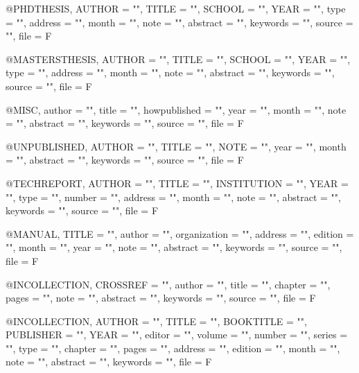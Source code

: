 @PHDTHESIS{,
  AUTHOR =       "",
  TITLE =        "",
  SCHOOL =       "",
  YEAR =         "",
  type =         "",
  address =      "",
  month =        "",
  note =         "",
  abstract =     "",
  keywords =     "",
  source =       "",
  file = F
}

@MASTERSTHESIS{,
  AUTHOR =       "",
  TITLE =        "",
  SCHOOL =       "",
  YEAR =         "",
  type =         "",
  address =      "",
  month =        "",
  note =         "",
  abstract =     "",
  keywords =     "",
  source =       "",
  file = F
}

@MISC{,
  author =       "",
  title =        "",
  howpublished = "",
  year =         "",
  month =        "",
  note =         "",
  abstract =     "",
  keywords =     "",
  source =       "",
  file = F
}

@UNPUBLISHED{,
  AUTHOR =       "",
  TITLE =        "",
  NOTE =         "",
  year =         "",
  month =        "",
  abstract =     "",
  keywords =     "",
  source =       "",
  file = F
}

@TECHREPORT{,
  AUTHOR =       "",
  TITLE =        "",
  INSTITUTION =  "",
  YEAR =         "",
  type =         "",
  number =       "",
  address =      "",
  month =        "",
  note =         "",
  abstract =     "",
  keywords =     "",
  source =       "",
  file = F
}

@MANUAL{,
  TITLE =        "",
  author =       "",
  organization = "",
  address =      "",
  edition =      "",
  month =        "",
  year =         "",
  note =         "",
  abstract =     "",
  keywords =     "",
  source =       "",
  file = F
}

@INCOLLECTION{,
  CROSSREF =     "",
  author =       "",
  title =        "",
  chapter =      "",
  pages =        "",
  note =         "",
  abstract =     "",
  keywords =     "",
  source =       "",
  file = F
}

@INCOLLECTION{,
  AUTHOR =       "",
  TITLE =        "",
  BOOKTITLE =    "",
  PUBLISHER =    "",
  YEAR =         "",
  editor =       "",
  volume =       "",
  number =       "",
  series =       "",
  type =         "",
  chapter =      "",
  pages =        "",
  address =      "",
  edition =      "",
  month =        "",
  note =         "",
  abstract =     "",
  keywords =     "",
  file = F
}
